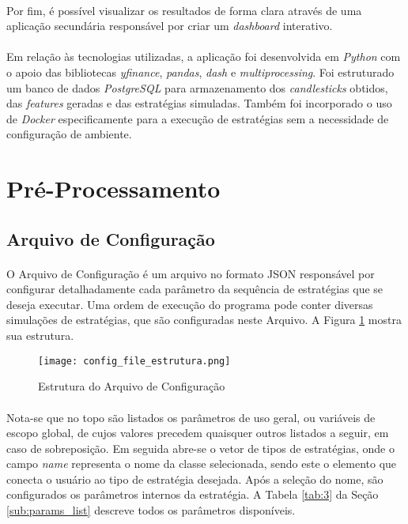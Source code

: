 \paragraph{} Por fim, é possível visualizar os resultados de forma clara através de uma aplicação secundária responsável por criar um \textit{dashboard} interativo.

\paragraph{} Em relação às tecnologias utilizadas, a aplicação foi desenvolvida em \textit{Python} com o apoio das bibliotecas \textit{yfinance}, \textit{pandas}, \textit{dash} e \textit{multiprocessing}. Foi estruturado um banco de dados \textit{PostgreSQL} para armazenamento dos \textit{candlesticks} obtidos, das \textit{features} geradas e das estratégias simuladas. Também foi incorporado o uso de \textit{Docker} especificamente para a execução de estratégias sem a necessidade de configuração de ambiente.

\section{Pré-Processamento}

\subsection{Arquivo de Configuração}
\label{sub:conf_file}

\paragraph{} O Arquivo de Configuração é um arquivo no formato JSON responsável por configurar detalhadamente cada parâmetro da sequência de estratégias que se deseja executar. Uma ordem de execução do programa pode conter diversas simulações de estratégias, que são configuradas neste Arquivo. A Figura \ref{fig:101} mostra sua estrutura.

\begin{figure}[h]
    \texttt{[image: config\_file\_estrutura.png]}
    \centering
    \caption{Estrutura do Arquivo de Configuração}
    \label{fig:101}
\end{figure}

\paragraph{} Nota-se que no topo são listados os parâmetros de uso geral, ou variáveis de escopo global, de cujos valores precedem quaisquer outros listados a seguir, em caso de sobreposição. Em seguida abre-se o vetor de tipos de estratégias, onde o campo \textit{name} representa o nome da classe selecionada, sendo este o elemento que conecta o usuário ao tipo de estratégia desejada. Após a seleção do nome, são configurados os parâmetros internos da estratégia. A Tabela \ref{tab:3} da Seção \ref{sub:params_list} descreve todos os parâmetros disponíveis.

